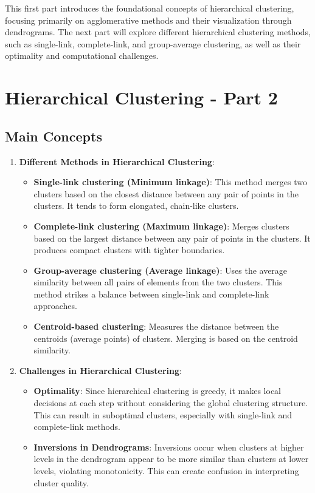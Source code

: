 \documentclass[a4paper,12pt]{article}
\begin{document}
\begin{enumerate}
This first part introduces the foundational concepts of hierarchical clustering, focusing primarily on agglomerative methods and their visualization through dendrograms. The next part will explore different hierarchical clustering methods, such as single-link, complete-link, and group-average clustering, as well as their optimality and computational challenges.

\section{Hierarchical Clustering - Part 2}

\subsection{Main Concepts}

\begin{enumerate}
    \item \textbf{Different Methods in Hierarchical Clustering}:
    \begin{itemize}
        \item \textbf{Single-link clustering (Minimum linkage)}: This method merges two clusters based on the closest distance between any pair of points in the clusters. It tends to form elongated, chain-like clusters.
        \item \textbf{Complete-link clustering (Maximum linkage)}: Merges clusters based on the largest distance between any pair of points in the clusters. It produces compact clusters with tighter boundaries.
        \item \textbf{Group-average clustering (Average linkage)}: Uses the average similarity between all pairs of elements from the two clusters. This method strikes a balance between single-link and complete-link approaches.
        \item \textbf{Centroid-based clustering}: Measures the distance between the centroids (average points) of clusters. Merging is based on the centroid similarity.
    \end{itemize}

    \item \textbf{Challenges in Hierarchical Clustering}:
    \begin{itemize}
        \item \textbf{Optimality}: Since hierarchical clustering is greedy, it makes local decisions at each step without considering the global clustering structure. This can result in suboptimal clusters, especially with single-link and complete-link methods.
        \item \textbf{Inversions in Dendrograms}: Inversions occur when clusters at higher levels in the dendrogram appear to be more similar than clusters at lower levels, violating monotonicity. This can create confusion in interpreting cluster quality.
    \end{itemize}


\end{enumerate}
\end{enumerate}
\end{document}
